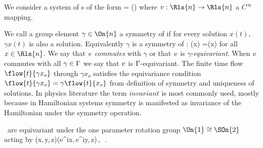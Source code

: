 

We consider a system of \ode s of the form
\beq
	\dot{\ssp} = \vf(\ssp)
	\label{eq:difeq}
\eeq
where $\vf: \Rls{n} \rightarrow \Rls{n}$ a $C^\infty$ mapping.

We call a group element $\gamma\in\On{n}$ a symmetry of
 if for every solution $x(t)$, $\gamma x(t)$
is also a solution. Equivalently $\gamma$ is a symmetry of :
\beq
	\vf(\gamma x) =\gamma \vf(x)
	\label{eq:equiv}
\eeq
for all $x\in\Rls{n}$. We say that $v$ \emph{commutes} with
$\gamma$ or that $v$ is $\gamma$-\emph{equivariant}. When
$v$ commutes with all $\gamma\in\Gamma$ we say that $v$
is $\Gamma$-equivariant. The finite time flow
$\flow{t}{\gamma x_o}$ through $\gamma x_o$ satisfies the
equivariance condition $\flow{t}{\gamma x_o}=\gamma
\flow{t}{x_o}$ from definition of symmetry and uniqueness of
solutions. In physics literature the term $invariant$ is most
commonly used, mostly because in Hamiltonian systems symmetry
is manifested as invariance of the Hamiltonian under the
symmetry operation.

\CLe\ are equivariant under the one parameter rotation
group $\Un{1}\cong\SOn{2}$ acting by
\beq
	(x,\,y,\,z)\mapsto (e^{i\theta}x,\,e^{i\theta}y,\,z)\,,\ \theta\in[0,2\pi]\,.
\eeq
{}

